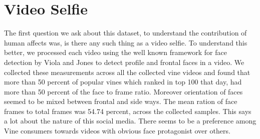 \section {Video Selfie}
The first question we ask about this dataset, to understand the contribution of human affects was, is there any such thing as a video selfie. To understand this better, we processed each video using the well known framework for face detection by Viola and Jones \cite{Viola:2004:RRF:966432.966458} to detect profile and frontal faces in a video. We collected these measurements across all the collected vine videos and found that more than 50 percent of popular vines which ranked in top 100 that day, had more than 50 percent of the face to frame ratio. Moreover orientation of faces seemed to be mixed between frontal and side ways. The mean ration of face frames to total frames was 54.74 percent, across the collected samples. This says a lot about the nature of this social media. There seems to be a preference among Vine consumers towards videos with obvious face protagonist over others. 

